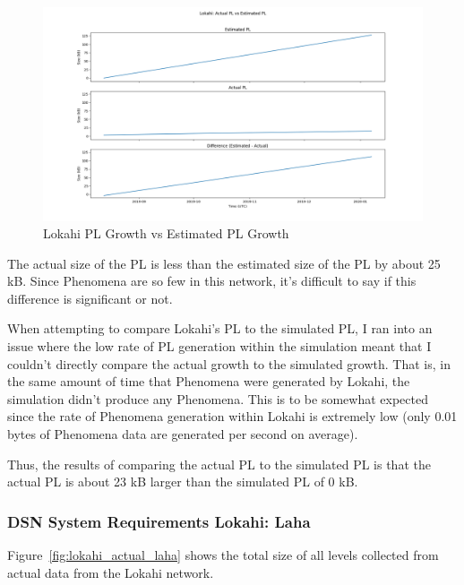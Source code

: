 \begin{figure}[H]
    \centering
    \includegraphics[width=\linewidth]{figures/lokahi_pl_actual_vs_est.png}
    \caption{Lokahi PL Growth vs Estimated PL Growth}
    \label{fig:lokahi_pl_actual_vs_est}
\end{figure}

The actual size of the PL is less than the estimated size of the PL by about 25 kB. Since Phenomena are so few in this network, it's difficult to say if this difference is significant or not.

When attempting to compare Lokahi's PL to the simulated PL, I ran into an issue where the low rate of PL generation within the simulation meant that I couldn't directly compare the actual growth to the simulated growth. That is, in the same amount of time that Phenomena were generated by Lokahi, the simulation didn't produce any Phenomena. This is to be somewhat expected since the rate of Phenomena generation within Lokahi is extremely low (only 0.01 bytes of Phenomena data are generated per second on average).

Thus, the results of comparing the actual PL to the simulated PL is that the actual PL is about 23 kB larger than the simulated PL of 0 kB.

\subsubsection{DSN System Requirements Lokahi: Laha}

Figure~\ref{fig:lokahi_actual_laha} shows the total size of all levels collected from actual data from the Lokahi network.

